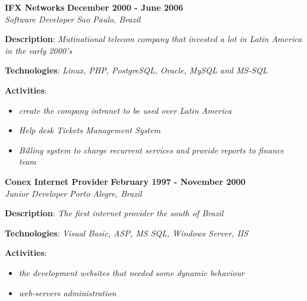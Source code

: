 \documentclass[margin]{res}
\begin{document}
\begin{resume}
  \textbf{IFX Networks} \hfill \textbf{December 2000 - June 2006}\\
  \textit{Software Developer} \hfill \textit{Sao Paulo, Brazil}\\
  \begin{description}
    \item{\textbf{Description}: \textit{Mutinational telecom company that invested a lot in Latin America in the early 2000's}}
    \item{\textbf{Technologies}: \textit{Linux, PHP, PostgreSQL, Oracle, MySQL and MS-SQL}}
    \item{
      \textbf{Activities}:
      \begin{itemize}
        \item{\textit{create the company intranet to be used over Latin America}}
        \item{\textit{Help desk Tickets Management System}}
        \item{\textit{Billing system to charge recurrent services and provide reports to finance team}}
      \end{itemize}
    }
  \end{description}

  \textbf{Conex Internet Provider} \hfill \textbf{February 1997 - November 2000}\\
  \textit{Junior Developer} \hfill \textit{Porto Alegre, Brazil}\\
  \begin{description}
    \item{\textbf{Description}: \textit{The first internet provider the south of Brazil}}
    \item{\textbf{Technologies}: \textit{Visual Basic, ASP, MS SQL, Windows Server, IIS}}
    \item{
      \textbf{Activities}:
      \begin{itemize}
        \item{\textit{the development websites that needed some dynamic behaviour}}
        \item{\textit{web-servers administration}}
      \end{itemize}
    }
  \end{description}


\pagebreak

\end{resume}
\end{document}
